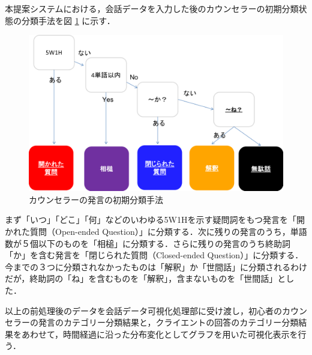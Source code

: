 \documentclass[shuuron]{kuee}
\begin{document}

本提案システムにおける，会話データを入力した後のカウンセラーの初期分類状態の分類手法を図
\ref{fig:5_2}
に示す．
\begin{figure}
  \begin{center}
    \includegraphics[width=\linewidth]{5_2.png}
  \end{center}
  \caption{カウンセラーの発言の初期分類手法}
  \label{fig:5_2}
\end{figure}
まず「いつ」「どこ」「何」などのいわゆる5W1Hを示す疑問詞をもつ発言を「開かれた質問（Open-ended Question）」に分類する．次に残りの発言のうち，単語数が５個以下のものを「相槌」に分類する．さらに残りの発言のうち終助詞「か」を含む発言を「閉じられた質問（Closed-ended Question）」に分類する．今までの３つに分類されなかったものは「解釈」か「世間話」に分類されるわけだが，終助詞の「ね」を含むものを「解釈」，含まないものを「世間話」とした．




以上の前処理後のデータを会話データ可視化処理部に受け渡し，初心者のカウンセラーの発言のカテゴリー分類結果と，クライエントの回答のカテゴリー分類結果をあわせて，時間経過に沿った分布変化としてグラフを用いた可視化表示を行う．
\end{document}
